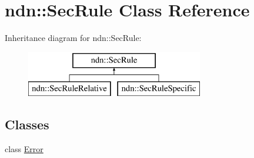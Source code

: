 \hypertarget{classndn_1_1SecRule}{}\section{ndn\+:\+:Sec\+Rule Class Reference}
\label{classndn_1_1SecRule}
Inheritance diagram for ndn\+:\+:Sec\+Rule\+:\begin{figure}[H]
\begin{center}
\leavevmode
\includegraphics[height=2.000000cm]{classndn_1_1SecRule}
\end{center}
\end{figure}
\subsection*{Classes}
\begin{DoxyCompactItemize}
\item 
class \hyperlink{classndn_1_1SecRule_1_1Error}{Error}
\end{DoxyCompactItemize}
